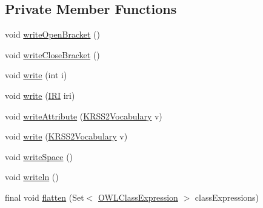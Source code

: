 \subsection*{Private Member Functions}
\begin{DoxyCompactItemize}
\item 
void \hyperlink{classde_1_1uulm_1_1ecs_1_1ai_1_1owlapi_1_1krssrenderer_1_1_k_r_s_s2_o_w_l_object_renderer_a52147b61f962a9115589754759d1c650}{write\-Open\-Bracket} ()
\item 
void \hyperlink{classde_1_1uulm_1_1ecs_1_1ai_1_1owlapi_1_1krssrenderer_1_1_k_r_s_s2_o_w_l_object_renderer_a75c491dcd694547de7441f9b0a9cb604}{write\-Close\-Bracket} ()
\item 
void \hyperlink{classde_1_1uulm_1_1ecs_1_1ai_1_1owlapi_1_1krssrenderer_1_1_k_r_s_s2_o_w_l_object_renderer_ad7d5c4ed4421f099cb1add9e9d076e3f}{write} (int i)
\item 
void \hyperlink{classde_1_1uulm_1_1ecs_1_1ai_1_1owlapi_1_1krssrenderer_1_1_k_r_s_s2_o_w_l_object_renderer_a804207ccf49f7778cd56f2dd6b013ea1}{write} (\hyperlink{classorg_1_1semanticweb_1_1owlapi_1_1model_1_1_i_r_i}{I\-R\-I} iri)
\item 
void \hyperlink{classde_1_1uulm_1_1ecs_1_1ai_1_1owlapi_1_1krssrenderer_1_1_k_r_s_s2_o_w_l_object_renderer_aae02caff5c46481965dcc15794a9a16b}{write\-Attribute} (\hyperlink{enumde_1_1uulm_1_1ecs_1_1ai_1_1owlapi_1_1krssrenderer_1_1_k_r_s_s2_vocabulary}{K\-R\-S\-S2\-Vocabulary} v)
\item 
void \hyperlink{classde_1_1uulm_1_1ecs_1_1ai_1_1owlapi_1_1krssrenderer_1_1_k_r_s_s2_o_w_l_object_renderer_a566855482a902daba698a1cd3b40901a}{write} (\hyperlink{enumde_1_1uulm_1_1ecs_1_1ai_1_1owlapi_1_1krssrenderer_1_1_k_r_s_s2_vocabulary}{K\-R\-S\-S2\-Vocabulary} v)
\item 
void \hyperlink{classde_1_1uulm_1_1ecs_1_1ai_1_1owlapi_1_1krssrenderer_1_1_k_r_s_s2_o_w_l_object_renderer_a73d2ad570005a7d6194934137719e48c}{write\-Space} ()
\item 
void \hyperlink{classde_1_1uulm_1_1ecs_1_1ai_1_1owlapi_1_1krssrenderer_1_1_k_r_s_s2_o_w_l_object_renderer_a9ef88f7ebb2ffa32aa38b8c02ee1deb2}{writeln} ()
\item 
final void \hyperlink{classde_1_1uulm_1_1ecs_1_1ai_1_1owlapi_1_1krssrenderer_1_1_k_r_s_s2_o_w_l_object_renderer_a02e521d864e7a2b1149a7c0cf12b17e3}{flatten} (Set$<$ \hyperlink{interfaceorg_1_1semanticweb_1_1owlapi_1_1model_1_1_o_w_l_class_expression}{O\-W\-L\-Class\-Expression} $>$ class\-Expressions)
\end{DoxyCompactItemize}
